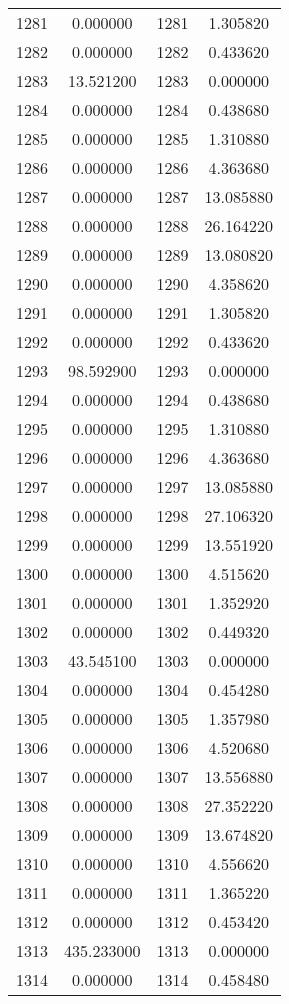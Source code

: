 \documentclass[12pt]{article}
\begin{document}
\begin{longtable}{@{}cccc@{}}
1281 & 0.000000 & 1281 & 1.305820 \\
1282 & 0.000000 & 1282 & 0.433620 \\
1283 & 13.521200 & 1283 & 0.000000 \\
1284 & 0.000000 & 1284 & 0.438680 \\
1285 & 0.000000 & 1285 & 1.310880 \\
1286 & 0.000000 & 1286 & 4.363680 \\
1287 & 0.000000 & 1287 & 13.085880 \\
1288 & 0.000000 & 1288 & 26.164220 \\
1289 & 0.000000 & 1289 & 13.080820 \\
1290 & 0.000000 & 1290 & 4.358620 \\
1291 & 0.000000 & 1291 & 1.305820 \\
1292 & 0.000000 & 1292 & 0.433620 \\
1293 & 98.592900 & 1293 & 0.000000 \\
1294 & 0.000000 & 1294 & 0.438680 \\
1295 & 0.000000 & 1295 & 1.310880 \\
1296 & 0.000000 & 1296 & 4.363680 \\
1297 & 0.000000 & 1297 & 13.085880 \\
1298 & 0.000000 & 1298 & 27.106320 \\
1299 & 0.000000 & 1299 & 13.551920 \\
1300 & 0.000000 & 1300 & 4.515620 \\
1301 & 0.000000 & 1301 & 1.352920 \\
1302 & 0.000000 & 1302 & 0.449320 \\
1303 & 43.545100 & 1303 & 0.000000 \\
1304 & 0.000000 & 1304 & 0.454280 \\
1305 & 0.000000 & 1305 & 1.357980 \\
1306 & 0.000000 & 1306 & 4.520680 \\
1307 & 0.000000 & 1307 & 13.556880 \\
1308 & 0.000000 & 1308 & 27.352220 \\
1309 & 0.000000 & 1309 & 13.674820 \\
1310 & 0.000000 & 1310 & 4.556620 \\
1311 & 0.000000 & 1311 & 1.365220 \\
1312 & 0.000000 & 1312 & 0.453420 \\
1313 & 435.233000 & 1313 & 0.000000 \\
1314 & 0.000000 & 1314 & 0.458480 \\

\end{longtable}
\end{document}
